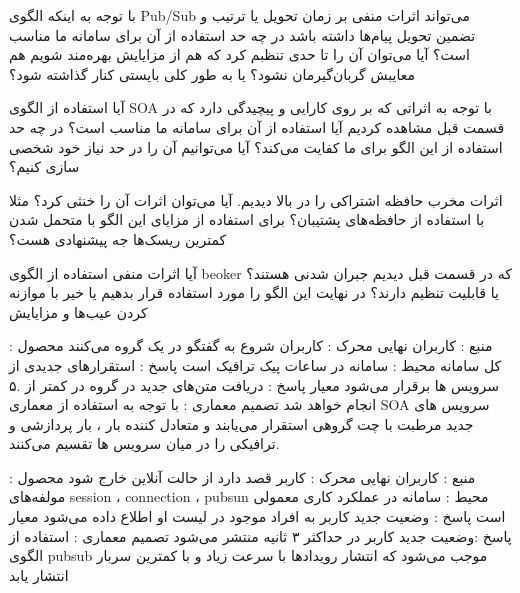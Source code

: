 
 

\begin{itemize}

	 با توجه به اینکه الگوی Pub/Sub می‌تواند اثرات منفی بر زمان تحویل یا ترتیب و تضمین تحویل پیام‌ها داشته باشد در چه حد استفاده از آن برای سامانه ما مناسب است؟ آیا می‌توان آن را تا حدی تنظبم کرد که هم از مزایایش بهره‌مند شویم هم معایبش گربان‌گیرمان نشود؟ یا به طور کلی بایستی کنار گذاشته شود؟

	 آیا استفاده از الگوی SOA با توجه به اثراتی که بر روی کارایی و پیچیدگی دارد که در قسمت قبل مشاهده کردیم آیا استفاده از آن برای سامانه ما مناسب است؟ در چه حد استفاده از این الگو برای ما کفایت می‌کند؟ آیا می‌توانیم آن را در حد نیاز خود شخصی سازی کنیم؟

	

	 اثرات مخرب حافظه اشتراکی را در بالا دیدیم. آیا می‌توان اثرات آن را خنثی کرد؟ مثلا با استفاده از حافظه‌های پشتیبان؟ برای استفاده از مزایای این الگو با متحمل شدن کمترین ریسک‌ها جه پیشنهادی هست؟

	 آیا اثرات منفی استفاده از الگوی beoker که در قسمت قبل دیدیم جبران شدنی هستند؟ یا قابلیت تنظیم دارند؟ در نهایت این الگو را مورد استفاده قرار بدهیم یا خیر با موازنه کردن عیب‌ها و مزایایش

	

	

\end{itemize}






\begin{itemize}
 منبع : کاربران نهایی
 محرک : کاربران شروع به گفتگو در یک گروه می‌کنند
 محصول : کل سامانه
 محیط : سامانه در ساعات پیک ترافیک است
 پاسخ : استقرارهای جدیدی از سرویس ها برقرار می‌شود
 معیار پاسخ : دریافت متن‌های جدید در گروه در کمتر از .۵ انجام خواهد شد
 تصمیم معماری : با توجه به استفاده از معماری SOA سرویس های جدید  مرطبت با چت گروهی استقرار می‌یابند و متعادل کننده بار ، بار پردازشی و ترافیکی را در میان سرویس ها تقسیم می‌کنند.
\end{itemize}

\begin{itemize}
 منبع : کاربران نهایی
 محرک : کاربر قصد دارد از حالت آنلاین خارج شود
 محصول : مولفه‌های session ، connection ، pubsun
 محیط : سامانه در عملکرد کاری معمولی است
 پاسخ : وضعیت جدید کاربر به افراد موجود در لیست او اطلاع داده می‌شود 
 معیار پاسخ :وضعیت جدید کاربر در حداکثر ۳ ثانیه منتشر می‌شود
 تصمیم معماری : استفاده از الگوی pubsub موجب می‌شود که انتشار رویدادها با سرعت زیاد و با کمترین سربار انتشار یابد
\end{itemize}


